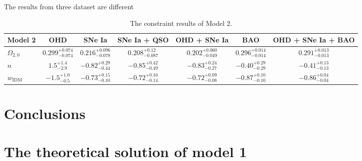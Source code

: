 \documentclass[twocolumn]{aastex631}
\begin{document}
   The results from three dataset are different

   \begin{table}[htbp]
      \centering
      \begin{tabular}{lcccccc}
         \hline\hline
         Model 2 & OHD & SNe Ia & SNe Ia + QSO 
         & OHD + SNe Ia & BAO & OHD + SNe Ia + BAO \\
         \hline
         $\Omega_{2,0}$ & $0.299_{-0.074}^{+0.074}$ & $0.216_{-0.078}^{+0.096}$
          & $0.208_{-0.087}^{+0.12}$ & $0.202_{-0.049}^{+0.060}$ 
          & $0.296_{-0.014}^{+0.014}$ & $0.291_{-0.013}^{+0.013}$ \\
         $n$ & $1.5_{-2.9}^{+1.4}$ & $-0.82_{-0.44}^{+0.29}$
          & $-0.85_{-0.49}^{+0.42}$ & $-0.83_{-0.27}^{+0.24}$
          & $-0.40_{-0.29}^{+0.29}$ & $-0.41_{-0.13}^{+0.13}$ \\
         $w_{\text{IDM}}$ & $-1.5_{-0.5}^{+1.0}$ & $-0.73_{-0.10}^{+0.15}$
          & $-0.72_{-0.14}^{+0.16}$ & $-0.72_{-0.08}^{+0.09}$
          & $-0.87_{-0.10}^{+0.10}$ & $-0.86_{-0.04}^{+0.04}$ \\
         \hline
      \end{tabular}
      \caption{The constraint results of Model 2.}
      \label{tab:6}
   \end{table}

\section{Conclusions}

\appendix

\section{The theoretical solution of model 1}
\end{document}
